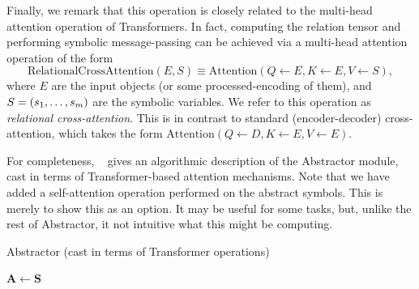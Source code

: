 Finally, we remark that this operation is closely related to the multi-head attention operation of Transformers. In fact, computing the relation tensor and performing symbolic message-passing can be achieved via a multi-head attention operation of the form
\begin{equation}\label{eq:relation_crossattention}
    \text{RelationalCrossAttention}\left(E, S\right) \equiv \text{Attention}\left( Q \gets E, K \gets E, V \gets S \right),
\end{equation}
where $E$ are the input objects (or some processed-encoding of them), and $S = (s_1, \ldots, s_m)$ are the symbolic variables. We refer to this operation as \textit{relational cross-attention}. This is in contrast to standard (encoder-decoder) cross-attention, which takes the form $\text{Attention}\left( Q \gets D, K \gets E, V \gets E \right)$.

For completeness, ~ gives an algorithmic description of the Abstractor module, cast in terms of Transformer-based attention mechanisms. Note that we have added a self-attention operation performed on the abstract symbols. This is merely to show this as an option. It may be useful for some tasks, but, unlike the rest of Abstractor, it not intuitive what this might be computing.

\begin{algorithm}[th!]
    \caption{Abstractor (cast in terms of Transformer operations)}\label{alg:relational_abstractor}


    \vspace{1em}

    $\bm{A} \gets \bm{S}$

\end{algorithm}

